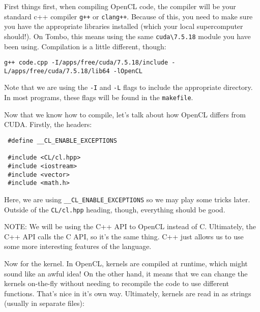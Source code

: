 \documentclass[11pt]{article}
\begin{document}
First things first, when compiling OpenCL code, the compiler will be your standard c++ compiler \lstinline{g++} or \lstinline{clang++}. Because of this, you need to make sure you have the appropriate libraries installed (which your local supercomputer should!). On Tombo, this means using the same \lstinline{cuda\7.5.18} module you have been using. Compilation is a little different, though:

\begin{lstlisting}
g++ code.cpp -I/apps/free/cuda/7.5.18/include -L/apps/free/cuda/7.5.18/lib64 -lOpenCL
\end{lstlisting}

Note that we are using the \lstinline{-I} and \lstinline{-L} flags to include the appropriate directory. In most programs, these flags will be found in the \lstinline{makefile}.

Now that we know how to compile, let's talk about how OpenCL differs from CUDA. Firstly, the headers:

\begin{lstlisting}
 #define __CL_ENABLE_EXCEPTIONS

 #include <CL/cl.hpp>
 #include <iostream>
 #include <vector>
 #include <math.h>

\end{lstlisting}

Here, we are using \lstinline{__CL_ENABLE_EXCEPTIONS} so we may play some tricks later. Outside of the \lstinline{CL/cl.hpp} heading, though, everything should be good.

NOTE: We will be using the C++ API to OpenCL instead of C. Ultimately, the C++ API calls the C API, so it's the same thing. C++ just allows us to use some more interesting features of the language.

Now for the kernel. In OpenCL, kernels are compiled at runtime, which might sound like an awful idea! On the other hand, it means that we can change the kernels on-the-fly without needing to recompile the code to use different functions. That's nice in it's own way. Ultimately, kernels are read in as strings (usually in separate files):
\end{document}
